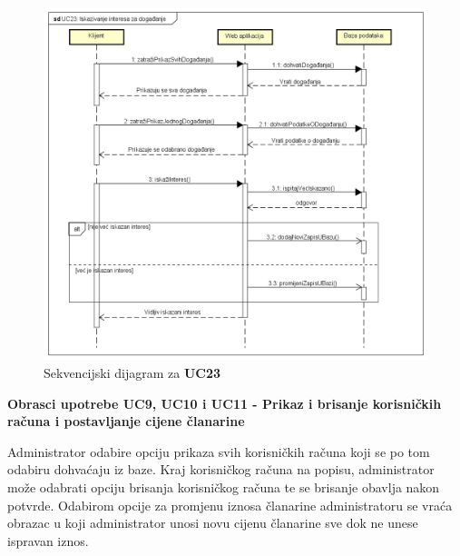 	\begin{figure}[H]
		\includegraphics[width=\textwidth]{dijagrami/sd3.PNG}
		\centering
		\caption{Sekvencijski dijagram za \textbf{UC23}}
		\label{fig:promjene}
	\end{figure}
	
	\newpage
	
	\noindent \textbf{Obrasci upotrebe UC9, UC10 i UC11 - Prikaz i brisanje korisničkih računa i postavljanje cijene članarine}
	
	\noindent Administrator odabire opciju prikaza svih korisničkih računa koji se po tom odabiru dohvaćaju iz baze. Kraj korisničkog računa na popisu, administrator može odabrati opciju brisanja korisničkog računa te se brisanje obavlja nakon potvrde. Odabirom opcije za promjenu iznosa članarine administratoru se vraća obrazac u koji administrator unosi novu cijenu članarine sve dok ne unese ispravan iznos.
	
	\vspace{-0.4cm}
	
